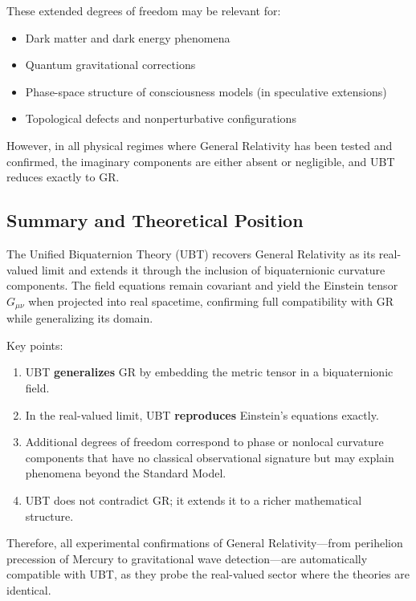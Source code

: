 These extended degrees of freedom may be relevant for:
\begin{itemize}
  \item Dark matter and dark energy phenomena
  \item Quantum gravitational corrections
  \item Phase-space structure of consciousness models (in speculative extensions)
  \item Topological defects and nonperturbative configurations
\end{itemize}

However, in all physical regimes where General Relativity has been tested and confirmed, the imaginary components are either absent or negligible, and UBT reduces exactly to GR.

\subsection{Summary and Theoretical Position}

The Unified Biquaternion Theory (UBT) recovers General Relativity as its real-valued limit and extends it through the inclusion of biquaternionic curvature components. The field equations remain covariant and yield the Einstein tensor $G_{\mu\nu}$ when projected into real spacetime, confirming full compatibility with GR while generalizing its domain.

Key points:
\begin{enumerate}
  \item UBT \textbf{generalizes} GR by embedding the metric tensor in a biquaternionic field.
  \item In the real-valued limit, UBT \textbf{reproduces} Einstein's equations exactly.
  \item Additional degrees of freedom correspond to phase or nonlocal curvature components that have no classical observational signature but may explain phenomena beyond the Standard Model.
  \item UBT does not contradict GR; it extends it to a richer mathematical structure.
\end{enumerate}

Therefore, all experimental confirmations of General Relativity—from perihelion precession of Mercury to gravitational wave detection—are automatically compatible with UBT, as they probe the real-valued sector where the theories are identical.


